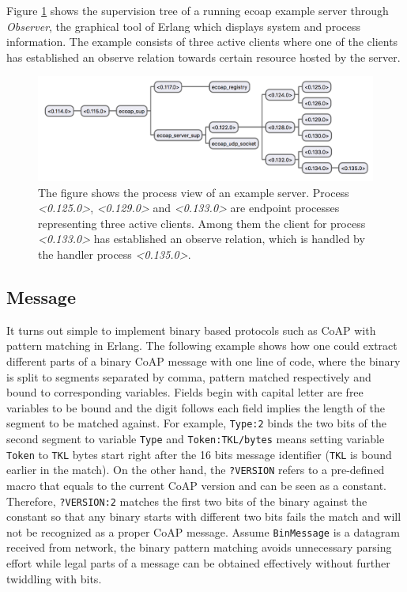 Figure \ref{fig:ecoap_process_view} shows the supervision tree of a running ecoap example server through \textit{Observer}, the graphical tool of Erlang which displays system and process information. The example consists of three active clients where one of the clients has established an observe relation towards certain resource hosted by the server. 

\begin{figure}[!htbp]
\centering
\includegraphics[scale = 0.6]{ecoap_process_view}
\caption[Process view of an example server]{The figure shows the process view of an example server. Process \textit{<0.125.0>},  \textit{<0.129.0>} and \textit{<0.133.0>} are endpoint processes representing three active clients. Among them the client for process \textit{<0.133.0>} has established an observe relation, which is handled by the handler process \textit{<0.135.0>}.}
\label{fig:ecoap_process_view}
\end{figure}

\subsection{Message}

It turns out simple to implement binary based protocols such as CoAP with pattern matching in Erlang. The following example shows how one could extract different parts of a binary CoAP message with one line of code, where the binary is split to segments separated by comma, pattern matched respectively and bound to corresponding variables. Fields begin with capital letter are free variables to be bound and the digit follows each field implies the length of the segment to be matched against. For example, \verb|Type:2| binds the two bits of the second segment to variable \verb|Type| and \verb|Token:TKL/bytes| means setting variable \verb|Token| to \verb|TKL| bytes start right after the 16 bits message identifier (\verb|TKL| is bound earlier in the match). On the other hand, the \verb|?VERSION| refers to a pre-defined macro that equals to the current CoAP version and can be seen as a constant. Therefore, \verb|?VERSION:2| matches the first two bits of the binary against the constant so that any binary starts with different two bits fails the match and will not be recognized as a proper CoAP message. Assume \verb|BinMessage| is a datagram received from network, the binary pattern matching avoids unnecessary parsing effort while legal parts of a message can be obtained effectively without further twiddling with bits. 

